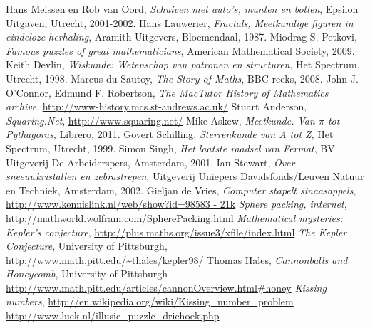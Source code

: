 
\begin{thebibliography}{17}
\label{1} Hans Meissen en Rob van Oord, \textit{Schuiven met auto's, munten en bollen}, Epsilon Uitgaven, Utrecht, 2001-2002.
\label{2} Hans Lauwerier, \textit{Fractals, Meetkundige figuren in eindeloze herhaling}, Aramith Uitgevers, Bloemendaal, 1987.
\label{3} Miodrag S. Petkovi, \textit{Famous puzzles of great mathematicians}, American Mathematical Society, 2009.
\label{4} Keith Devlin, \textit{Wiskunde: Wetenschap van patronen en structuren}, Het Spectrum, Utrecht, 1998.
\label{5} Marcus du Sautoy, \textit{The Story of Maths}, BBC reeks, 2008.
\label{6} John J. O'Connor, Edmund F. Robertson, \textit{The MacTutor History of Mathematics archive}, \url{http://www-history.mcs.st-andrews.ac.uk/}
\label{7} Stuart Anderson, \textit{Squaring.Net}, \url{http://www.squaring.net/}
\label{8} Mike Askew, \textit{Meetkunde. Van $\pi$ tot Pythagoras}, Librero, 2011.
\label{9} Govert Schilling, \textit{Sterrenkunde van A tot Z}, Het Spectrum, Utrecht, 1999.
\label{10} Simon Singh, \textit{Het laatste raadsel van Fermat}, BV Uitgeverij De Arbeiderspers, Amsterdam, 2001.
\label{11} Ian Stewart, \textit{Over sneeuwkristallen en zebrastrepen}, Uitgeverij Uniepers Davidsfonds/Leuven Natuur en Techniek, Amsterdam, 2002.
\label{12} Gieljan de Vries, \textit{Computer stapelt sinaasappels}, \url{http://www.kennislink.nl/web/show?id=98583 - 21k}
\label{13} \textit{Sphere packing, internet}, \url{http://mathworld.wolfram.com/SpherePacking.html}
\label{14} \textit{Mathematical mysteries: Kepler's conjecture}, \url{http://plus.maths.org/issue3/xfile/index.html}
\label{15} \textit{The Kepler Conjecture}, University of Pittsburgh, \url{http://www.math.pitt.edu/~thales/kepler98/}
\label{16} Thomas Hales, \textit{Cannonballs and Honeycomb}, University of Pittsburgh \url{http://www.math.pitt.edu/articles/cannonOverview.html#honey}
\label{17} \textit{Kissing numbers}, \url{http://en.wikipedia.org/wiki/Kissing_number_problem}
\label{18} \url{http://www.luek.nl/illusie\_puzzle\_driehoek.php}
\end{thebibliography}
